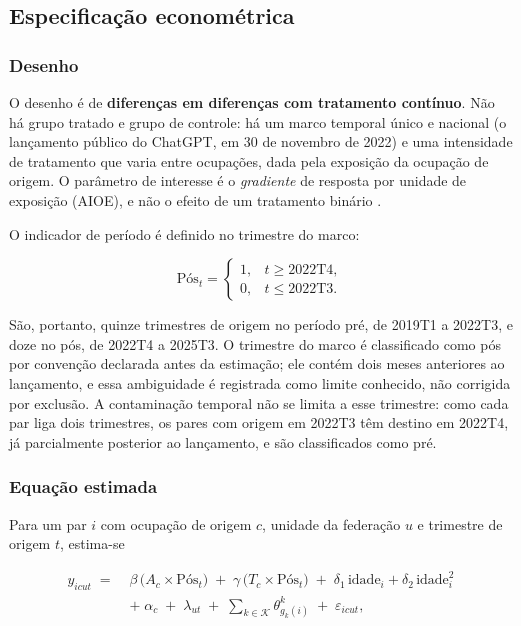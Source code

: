 \subsection{Especificação econométrica}
\label{sec:espec}

\subsubsection{Desenho}

O desenho é de \textbf{diferenças em diferenças com tratamento contínuo}. Não há
grupo tratado e grupo de controle: há um marco temporal único e nacional (o
lançamento público do ChatGPT, em 30 de novembro de 2022) e uma intensidade
de tratamento que varia entre ocupações, dada pela exposição da ocupação de
origem. O parâmetro de interesse é o \emph{gradiente} de resposta por unidade de exposição (AIOE), e não o efeito de um tratamento binário
\parencite{callaway2024}.

O indicador de período é definido no trimestre do marco:

\begin{equation}
  \text{Pós}_t =
  \begin{cases}
    1, & t \geq 2022\text{T}4, \\
    0, & t \leq 2022\text{T}3.
  \end{cases}
  \label{eq:pos}
\end{equation}

São, portanto, quinze trimestres de origem no período pré, de 2019T1 a 2022T3, e
doze no pós, de 2022T4 a 2025T3. O trimestre do marco é classificado como pós
por convenção declarada antes da estimação; ele contém dois meses anteriores ao
lançamento, e essa ambiguidade é registrada como limite conhecido, não corrigida
por exclusão. A contaminação temporal não se limita a esse trimestre: como cada
par liga dois trimestres, os pares com origem em 2022T3 têm destino em 2022T4,
já parcialmente posterior ao lançamento, e são classificados como pré.

\subsubsection{Equação estimada}

Para um par $i$ com ocupação de origem $c$, unidade da federação $u$ e trimestre
de origem $t$, estima-se

\begin{equation}
\begin{split}
  y_{icut} \;=\;{}& \beta \, \big( A_c \times \text{Pós}_t \big)
  \;+\; \gamma \, \big( T_c \times \text{Pós}_t \big)
  \;+\; \delta_1 \, \text{idade}_i + \delta_2 \, \text{idade}_i^2 \\[2pt]
  &+\; \alpha_c \;+\; \lambda_{ut} \;+\; \sum_{k \in \mathcal{K}} \theta^{k}_{g_k(i)}
  \;+\; \varepsilon_{icut},
\end{split}
  \label{eq:principal}
\end{equation}

